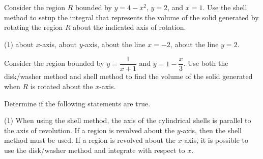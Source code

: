 \documentclass[../mathNotesPreamble]{subfiles}
\begin{document}
\begin{ex*}
    Consider the region $R$ bounded by $y=4-x^2$, $y=2$, and $x=1$. Use the shell method to setup the integral that represents the volume of the solid generated by rotating the region $R$ about the indicated axis of rotation.
  \end{ex*}
  \begin{flushright}
  \end{flushright}
  \begin{tasks}[after-item-skip=\stretch{1}, label=](1)
    \task 
      about $x$-axis,
    \task 
      about $y$-axis,
    \task 
      about the line $x=-2$,
    \task 
      about the line $y=2$.
  \end{tasks}
  \pagebreak

  \begin{ex*}
    Consider the region bounded by $y=\dfrac{1}{x+1}$ and $y=1-\dfrac{x}{3}$. Use both the disk/washer method and shell method to find the volume of the solid generated when $R$ is rotated about the $x$-axis.
  \end{ex*}
  \pagebreak

  \begin{ex*}
    Determine if the following statements are true.
  \end{ex*}
  \begin{tasks}[after-item-skip=\stretch{1}, label=](1)
    \task 
      When using the shell method, the axis of the cylindrical shells is parallel to the axis of revolution.
    \task 
      If a region is revolved about the $y$-axis, then the shell method must be used.
    \task 
      If a region is revolved about the $x$-axis, it is possible to use the disk/washer method and integrate with respect to $x$.
  \end{tasks}
  \pagebreak
\end{document}
